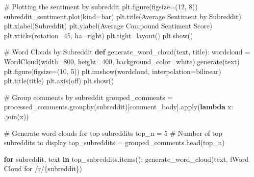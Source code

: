 \documentclass[
  12pt,
  letterpaper,
  DIV=11,
  numbers=noendperiod]{scrartcl}
\newenvironment{Shaded}{\begin{snugshade}}{\end{snugshade}}
\newcommand{\BuiltInTok}[1]{\textcolor[rgb]{0.00,0.23,0.31}{#1}}
\newcommand{\CommentTok}[1]{\textcolor[rgb]{0.37,0.37,0.37}{#1}}
\newcommand{\ControlFlowTok}[1]{\textcolor[rgb]{0.00,0.23,0.31}{\textbf{#1}}}
\newcommand{\DecValTok}[1]{\textcolor[rgb]{0.68,0.00,0.00}{#1}}
\newcommand{\KeywordTok}[1]{\textcolor[rgb]{0.00,0.23,0.31}{\textbf{#1}}}
\newcommand{\NormalTok}[1]{\textcolor[rgb]{0.00,0.23,0.31}{#1}}
\newcommand{\OperatorTok}[1]{\textcolor[rgb]{0.37,0.37,0.37}{#1}}
\newcommand{\SpecialCharTok}[1]{\textcolor[rgb]{0.37,0.37,0.37}{#1}}
\newcommand{\SpecialStringTok}[1]{\textcolor[rgb]{0.13,0.47,0.30}{#1}}
\newcommand{\StringTok}[1]{\textcolor[rgb]{0.13,0.47,0.30}{#1}}
\begin{document}
\begin{Shaded}
\begin{Highlighting}[]
\CommentTok{\# Plotting the sentiment by subreddit}
\NormalTok{plt.figure(figsize}\OperatorTok{=}\NormalTok{(}\DecValTok{12}\NormalTok{, }\DecValTok{8}\NormalTok{))}
\NormalTok{subreddit\_sentiment.plot(kind}\OperatorTok{=}\StringTok{\textquotesingle{}bar\textquotesingle{}}\NormalTok{)}
\NormalTok{plt.title(}\StringTok{\textquotesingle{}Average Sentiment by Subreddit\textquotesingle{}}\NormalTok{)}
\NormalTok{plt.xlabel(}\StringTok{\textquotesingle{}Subreddit\textquotesingle{}}\NormalTok{)}
\NormalTok{plt.ylabel(}\StringTok{\textquotesingle{}Average Compound Sentiment Score\textquotesingle{}}\NormalTok{)}
\NormalTok{plt.xticks(rotation}\OperatorTok{=}\DecValTok{45}\NormalTok{, ha}\OperatorTok{=}\StringTok{\textquotesingle{}right\textquotesingle{}}\NormalTok{)}
\NormalTok{plt.tight\_layout()}
\NormalTok{plt.show()}

\CommentTok{\# Word Clouds by Subreddit}
\KeywordTok{def}\NormalTok{ generate\_word\_cloud(text, title):}
\NormalTok{    wordcloud }\OperatorTok{=}\NormalTok{ WordCloud(width}\OperatorTok{=}\DecValTok{800}\NormalTok{, height}\OperatorTok{=}\DecValTok{400}\NormalTok{, background\_color}\OperatorTok{=}\StringTok{\textquotesingle{}white\textquotesingle{}}\NormalTok{).generate(text)}
\NormalTok{    plt.figure(figsize}\OperatorTok{=}\NormalTok{(}\DecValTok{10}\NormalTok{, }\DecValTok{5}\NormalTok{))}
\NormalTok{    plt.imshow(wordcloud, interpolation}\OperatorTok{=}\StringTok{\textquotesingle{}bilinear\textquotesingle{}}\NormalTok{)}
\NormalTok{    plt.title(title)}
\NormalTok{    plt.axis(}\StringTok{\textquotesingle{}off\textquotesingle{}}\NormalTok{)}
\NormalTok{    plt.show()}

\CommentTok{\# Group comments by subreddit}
\NormalTok{grouped\_comments }\OperatorTok{=}\NormalTok{ processed\_comments.groupby(}\StringTok{\textquotesingle{}subreddit\textquotesingle{}}\NormalTok{)[}\StringTok{\textquotesingle{}comment\_body\textquotesingle{}}\NormalTok{].}\BuiltInTok{apply}\NormalTok{(}\KeywordTok{lambda}\NormalTok{ x: }\StringTok{\textquotesingle{} \textquotesingle{}}\NormalTok{.join(x))}

\CommentTok{\# Generate word clouds for top subreddits}
\NormalTok{top\_n }\OperatorTok{=} \DecValTok{5}  \CommentTok{\# Number of top subreddits to display}
\NormalTok{top\_subreddits }\OperatorTok{=}\NormalTok{ grouped\_comments.head(top\_n)}

\ControlFlowTok{for}\NormalTok{ subreddit, text }\KeywordTok{in}\NormalTok{ top\_subreddits.items():}
\NormalTok{    generate\_word\_cloud(text, }\SpecialStringTok{f\textquotesingle{}Word Cloud for /r/}\SpecialCharTok{\{}\NormalTok{subreddit}\SpecialCharTok{\}}\SpecialStringTok{\textquotesingle{}}\NormalTok{)}
\end{Highlighting}
\end{Shaded}
\end{document}
